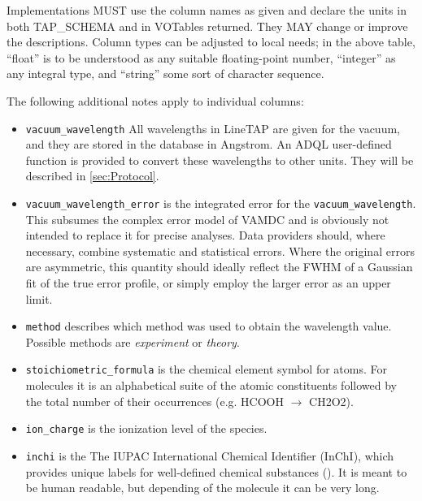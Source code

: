 \documentclass[11pt,a4paper]{ivoa}
\begin{document}
Implementations MUST use the column names as given and declare the units
in both TAP\_SCHEMA and in VOTables returned.  They MAY change or improve
the descriptions.  Column types can be adjusted to local needs; in the
above table, ``float'' is to be understood as any suitable
floating-point number, ``integer'' as any integral type, and ``string''
some sort of character sequence.

The following additional notes apply to individual columns:

\begin{itemize}
\item \texttt{vacuum\_wavelength}
All wavelengths in LineTAP are given for the vacuum,
and  they are stored in the database in
Angstrom.  An  ADQL user-defined function is provided to convert these
wavelengths to other units. They will be described in
\ref{sec:Protocol}.

\item \texttt{vacuum\_wavelength\_error} is the integrated error for the 
\texttt{vacuum\_wavelength}.  This subsumes the complex error model of
VAMDC and is obviously not intended to replace it for precise analyses.
Data providers should, where necessary, combine systematic and
statistical errors.  Where the original errors are asymmetric, this
quantity should ideally reflect the FWHM of a Gaussian fit of the true
error profile, or simply employ the larger error as an upper limit.

\item \texttt{method} describes which method was used to obtain the
wavelength value. Possible methods are \textit{experiment} or \textit{theory}.

\item \texttt{stoichiometric\_formula} is the chemical element symbol
for atoms. For molecules it is an alphabetical suite of the atomic
constituents followed by the total number of their occurrences (e.g.
HCOOH $\to$ CH2O2).

\item \texttt{ion\_charge} is the ionization level of the species.

\item \texttt{inchi} is the The IUPAC International Chemical Identifier
(InChI), which  provides unique labels for well-defined chemical
substances (\cite{INCHI}). It is meant to be human readable, but
depending of the molecule it can be very long.


\end{itemize}
\end{document}
